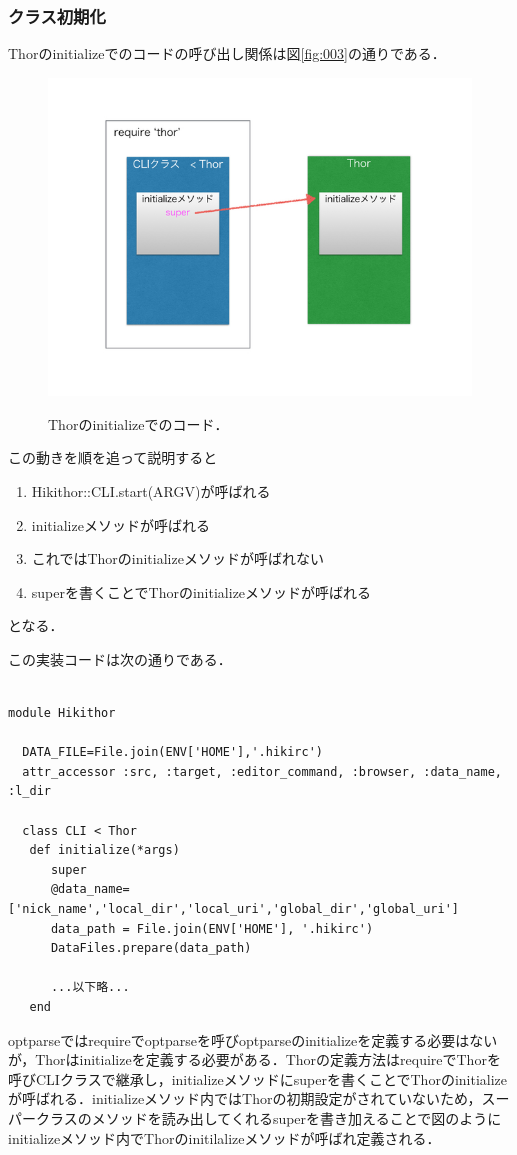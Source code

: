 \subsubsection{クラス初期化}
Thorのinitializeでのコードの呼び出し関係は図\ref{fig:003}の通りである．

\begin{figure}[htbp]\begin{center}
\includegraphics[width=12cm,bb= 0 0 937 753]{../figs/./hikiutils_yamane.003.jpg}
\caption{Thorのinitializeでのコード．}
\label{fig:003}
\label{default}\end{center}\end{figure}
この動きを順を追って説明すると

\begin{enumerate}
\item Hikithor::CLI.start(ARGV)が呼ばれる
\item initializeメソッドが呼ばれる
\item これではThorのinitializeメソッドが呼ばれない
\item superを書くことでThorのinitializeメソッドが呼ばれる
\end{enumerate}
となる．

この実装コードは次の通りである．
\begin{lstlisting}[style=customRuby,basicstyle={\scriptsize\ttfamily}]

module Hikithor

  DATA_FILE=File.join(ENV['HOME'],'.hikirc')
  attr_accessor :src, :target, :editor_command, :browser, :data_name, :l_dir

  class CLI < Thor
   def initialize(*args)
      super
      @data_name=['nick_name','local_dir','local_uri','global_dir','global_uri']
      data_path = File.join(ENV['HOME'], '.hikirc')
      DataFiles.prepare(data_path)

      ...以下略...
   end
\end{lstlisting}
optparseではrequireでoptparseを呼びoptparseのinitializeを定義する必要はないが，Thorはinitializeを定義する必要がある．Thorの定義方法はrequireでThorを呼びCLIクラスで継承し，initializeメソッドにsuperを書くことでThorのinitializeが呼ばれる．initializeメソッド内ではThorの初期設定がされていないため，スーパークラスのメソッドを読み出してくれるsuperを書き加えることで図のようにinitializeメソッド内でThorのinitilalizeメソッドが呼ばれ定義される．

